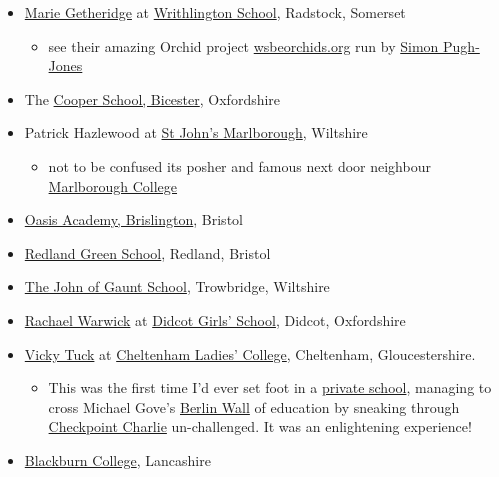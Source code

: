 \documentclass[
]{book}
\providecommand{\tightlist}{%
  \setlength{\itemsep}{0pt}\setlength{\parskip}{0pt}}
\begin{document}
\begin{itemize}
\tightlist
\item
  \href{https://wessexlearningtrust.co.uk/teammembers/marie-getheridge/}{Marie Getheridge} at \href{https://en.wikipedia.org/wiki/Writhlington_School}{Writhlington School}, Radstock, Somerset

  \begin{itemize}
  \tightlist
  \item
    see their amazing Orchid project \href{https://wsbeorchids.org/thirty-years-of-the-writhlington-schools-orchid-project-a-teachers-view-by-simon-pugh-jones/}{wsbeorchids.org} run by \href{https://www.bristol.ac.uk/graduation/honorary-degrees/honorary-graduates-2019/simon-pugh-jones/}{Simon Pugh-Jones}
  \end{itemize}
\item
  The \href{https://en.wikipedia.org/wiki/Cooper_School,_Bicester}{Cooper School, Bicester}, Oxfordshire
\item
  Patrick Hazlewood at \href{https://en.wikipedia.org/wiki/St_John\%27s_Marlborough}{St John's Marlborough}, Wiltshire

  \begin{itemize}
  \tightlist
  \item
    not to be confused its posher and famous next door neighbour \href{https://en.wikipedia.org/wiki/Marlborough_College}{Marlborough College}
  \end{itemize}
\item
  \href{https://en.wikipedia.org/wiki/Oasis_Academy_Brislington}{Oasis Academy, Brislington}, Bristol
\item
  \href{https://en.wikipedia.org/wiki/Redland_Green_School}{Redland Green School}, Redland, Bristol
\item
  \href{https://en.wikipedia.org/wiki/The_John_of_Gaunt_School}{The John of Gaunt School}, Trowbridge, Wiltshire
\item
  \href{https://twitter.com/rachaelwarwick7}{Rachael Warwick} at \href{https://en.wikipedia.org/wiki/Didcot_Girls\%27_School}{Didcot Girls' School}, Didcot, Oxfordshire
\item
  \href{http://news.bbc.co.uk/local/gloucestershire/hi/people_and_places/newsid_8741000/8741279.stm}{Vicky Tuck} at \href{https://en.wikipedia.org/wiki/Cheltenham_Ladies\%27_College}{Cheltenham Ladies' College}, Cheltenham, Gloucestershire. \citep{cheltenham, tuck}

  \begin{itemize}
  \tightlist
  \item
    This was the first time I'd ever set foot in a \href{https://en.wikipedia.org/wiki/Independent_school_(United_Kingdom)}{private school}, managing to cross Michael Gove's \href{https://en.wikipedia.org/wiki/Berlin_Wall}{Berlin Wall} of education by sneaking through \href{https://en.wikipedia.org/wiki/Checkpoint_Charlie}{Checkpoint Charlie} un-challenged. It was an enlightening experience! \citep{berlinwall}
  \end{itemize}
\item
  \href{https://en.wikipedia.org/wiki/Blackburn_College,_Lancashire}{Blackburn College}, Lancashire


\end{itemize}
\end{document}
